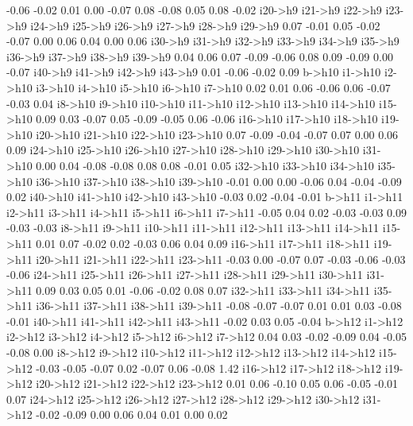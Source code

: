 \documentclass{article}
\begin{document}
\begin{Schunk}
\begin{Soutput}
  -0.06   -0.02    0.01    0.00   -0.07    0.08   -0.08    0.05    0.08   -0.02 
i20->h9 i21->h9 i22->h9 i23->h9 i24->h9 i25->h9 i26->h9 i27->h9 i28->h9 i29->h9 
   0.07   -0.01    0.05   -0.02   -0.07    0.00    0.06    0.04    0.00    0.06 
i30->h9 i31->h9 i32->h9 i33->h9 i34->h9 i35->h9 i36->h9 i37->h9 i38->h9 i39->h9 
   0.04    0.06    0.07   -0.09   -0.06    0.08    0.09   -0.09    0.00   -0.07 
i40->h9 i41->h9 i42->h9 i43->h9 
   0.01   -0.06   -0.02    0.09 
  b->h10  i1->h10  i2->h10  i3->h10  i4->h10  i5->h10  i6->h10  i7->h10 
    0.02     0.01     0.06    -0.06     0.06    -0.07    -0.03     0.04 
 i8->h10  i9->h10 i10->h10 i11->h10 i12->h10 i13->h10 i14->h10 i15->h10 
    0.09     0.03    -0.07     0.05    -0.09    -0.05     0.06    -0.06 
i16->h10 i17->h10 i18->h10 i19->h10 i20->h10 i21->h10 i22->h10 i23->h10 
    0.07    -0.09    -0.04    -0.07     0.07     0.00     0.06     0.09 
i24->h10 i25->h10 i26->h10 i27->h10 i28->h10 i29->h10 i30->h10 i31->h10 
    0.00     0.04    -0.08    -0.08     0.08     0.08    -0.01     0.05 
i32->h10 i33->h10 i34->h10 i35->h10 i36->h10 i37->h10 i38->h10 i39->h10 
   -0.01     0.00     0.00    -0.06     0.04    -0.04    -0.09     0.02 
i40->h10 i41->h10 i42->h10 i43->h10 
   -0.03     0.02    -0.04    -0.01 
  b->h11  i1->h11  i2->h11  i3->h11  i4->h11  i5->h11  i6->h11  i7->h11 
   -0.05     0.04     0.02    -0.03    -0.03     0.09    -0.03    -0.03 
 i8->h11  i9->h11 i10->h11 i11->h11 i12->h11 i13->h11 i14->h11 i15->h11 
    0.01     0.07    -0.02     0.02    -0.03     0.06     0.04     0.09 
i16->h11 i17->h11 i18->h11 i19->h11 i20->h11 i21->h11 i22->h11 i23->h11 
   -0.03     0.00    -0.07     0.07    -0.03    -0.06    -0.03    -0.06 
i24->h11 i25->h11 i26->h11 i27->h11 i28->h11 i29->h11 i30->h11 i31->h11 
    0.09     0.03     0.05     0.01    -0.06    -0.02     0.08     0.07 
i32->h11 i33->h11 i34->h11 i35->h11 i36->h11 i37->h11 i38->h11 i39->h11 
   -0.08    -0.07    -0.07     0.01     0.01     0.03    -0.08    -0.01 
i40->h11 i41->h11 i42->h11 i43->h11 
   -0.02     0.03     0.05    -0.04 
  b->h12  i1->h12  i2->h12  i3->h12  i4->h12  i5->h12  i6->h12  i7->h12 
    0.04     0.03    -0.02    -0.09     0.04    -0.05    -0.08     0.00 
 i8->h12  i9->h12 i10->h12 i11->h12 i12->h12 i13->h12 i14->h12 i15->h12 
   -0.03    -0.05    -0.07     0.02    -0.07     0.06    -0.08     1.42 
i16->h12 i17->h12 i18->h12 i19->h12 i20->h12 i21->h12 i22->h12 i23->h12 
    0.01     0.06    -0.10     0.05     0.06    -0.05    -0.01     0.07 
i24->h12 i25->h12 i26->h12 i27->h12 i28->h12 i29->h12 i30->h12 i31->h12 
   -0.02    -0.09     0.00     0.06     0.04     0.01     0.00     0.02 

\end{Soutput}
\end{Schunk}
\end{document}

